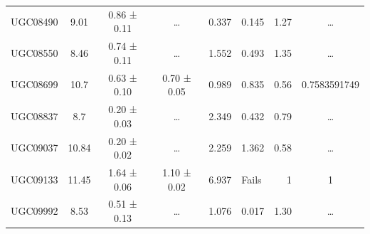 \documentclass[reprint,%
 amsmath,amssymb,
 aps,
]{revtex4-1}
\begin{document}
\begin{table}[]
\begin{tabular}{cccccrrc}
\rowcolor[HTML]{F3F3F3} 
UGC08490             & 9.01                      & 0.86 ± 0.11           & …                      & 0.337                                                        & 0.145                                                           & 1.27                                                           & …                                                             \\
\rowcolor[HTML]{F3F3F3} 
UGC08550             & 8.46                      & 0.74 ± 0.11           & …                      & 1.552                                                        & 0.493                                                         & 1.35                                                           & …                                                             \\
\rowcolor[HTML]{F3F3F3} 
UGC08699             & 10.7                      & 0.63 ± 0.10           & 0.70 ± 0.05            & 0.989                                                        & 0.835                                                         & 0.56                                                           & \multicolumn{1}{r}{\cellcolor[HTML]{F3F3F3}0.7583591749}      \\
\rowcolor[HTML]{F3F3F3} 
UGC08837             & 8.7                       & 0.20 ± 0.03           & …                      & 2.349                                                        & 0.432                                                        & 0.79                                                         & …                                                             \\
\rowcolor[HTML]{F3F3F3} 
UGC09037             & 10.84                     & 0.20 ± 0.02           & …                      & 2.259                                                        & 1.362                                                           & 0.58                                                          & …                                                             \\
\rowcolor[HTML]{F3F3F3} 
UGC09133             & 11.45                     & 1.64 ± 0.06           & 1.10 ± 0.02            & 6.937                                                        & \multicolumn{1}{l}{\cellcolor[HTML]{F3F3F3}Fails}                     & 1                                                                     & 1                                                             \\
\rowcolor[HTML]{F3F3F3} 
UGC09992             & 8.53                      & 0.51 ± 0.13           & …                      & 1.076                                                        & 0.017                                                         & 1.30                                                           & …                                                             \\

\end{tabular}
\end{table}
\end{document}
